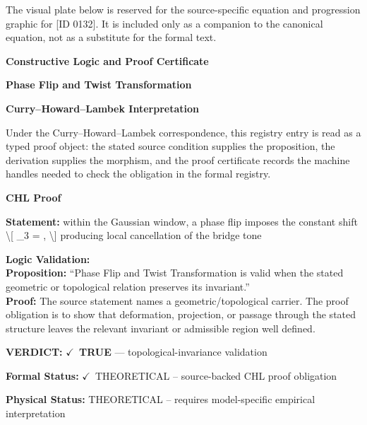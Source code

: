\begingroup\footnotesize\sloppy
The visual plate below is reserved for the source-specific equation and progression graphic for [ID 0132]. It is included only as a companion to the canonical equation, not as a substitute for the formal text.
\par\endgroup
\ifTZPDarkEdition
{}
\fi

\clearpage
\begingroup\tzpsupportsetup
\noindent\textbf{\fontsize{10.8pt}{12.8pt}\selectfont [ID 0132] Constructive Logic and Proof Certificate}\par
\noindent\textbf{\fontsize{10pt}{12pt}\selectfont Phase Flip and Twist Transformation}\par
\vspace{0.45em}
\begingroup
\footnotesize
\setlength{\parskip}{0.22em}
\setlength{\parindent}{0pt}
\noindent\textbf{Curry--Howard--Lambek Interpretation}\par
Under the Curry--Howard--Lambek correspondence, this registry entry is read as a typed proof
object: the stated source condition supplies the proposition, the derivation supplies the
morphism, and the proof certificate records the machine handles needed to check the obligation
in the formal registry.

\vspace{0.45em}
\noindent\textbf{CHL Proof}\par
\textbf{Statement:} within the Gaussian window, a phase flip imposes the constant shift \textbackslash{}[ \_3 = , \textbackslash{}]
producing local cancellation of the bridge tone

\textbf{Logic Validation:}\\
\textbf{Proposition:} ``Phase Flip and Twist Transformation is valid when the stated geometric or topological
relation preserves its invariant.''\\
\textbf{Proof:} The source statement names a geometric/topological carrier. The proof obligation is to
show that deformation, projection, or passage through the stated structure leaves the
relevant invariant or admissible region well defined.

\textbf{VERDICT:} \ensuremath{\checkmark}\ \textbf{TRUE} --- topological-invariance validation

\textbf{Formal Status:} \ensuremath{\checkmark}\ THEORETICAL -- source-backed CHL proof obligation

\textbf{Physical Status:} THEORETICAL -- requires model-specific empirical interpretation
\par\vspace{0.45em}
\par
\ifTZPDarkEdition
{}
\fi
\endgroup
\endgroup

